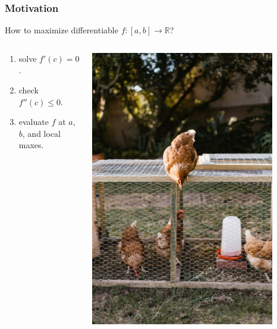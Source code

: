 \documentclass{beamer}
\begin{document}
\begin{frame}
    \frametitle{Motivation}
    How to maximize differentiable $f:[a, b] \to \mathbb{R}$?


    \begin{columns}
        \begin{column}{0.6\textwidth}
            \begin{enumerate}
                \pause
                \item solve $f'(c) = 0$.
                    \pause
                \item check $f''(c) \leq 0$.
                    \pause
                \item evaluate $f$ at $a$, $b$, and local maxes.
            \end{enumerate}
        \end{column}
        \pause
        \begin{column}{0.4\textwidth}
            \vspace{15pt}

            \includegraphics[width=0.85\textwidth]{./fig/image-asset.jpeg}
        \end{column}
    \end{columns}
\end{frame}
\end{document}
